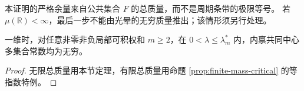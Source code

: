 \begin{remark}
本证明的严格余量来自公共集合 $F$ 的总质量，而不是周期条带的极限等号。
若 $\mu(\mathbb R)<\infty$，最后一步不能由光晕的无穷质量推出；该情形须另行处理。
\end{remark}

\begin{corollary}
一维时，对任意非零非负局部可积权和 $m\ge2$，在 $0<\lambda\le\lambda_m^*$ 内，内禀共同中心多集合常数均为无穷。
\end{corollary}
\begin{proof}无限总质量用本节定理，有限总质量用命题 \ref{prop:finite-mass-critical} 的等指数特例。\end{proof}
